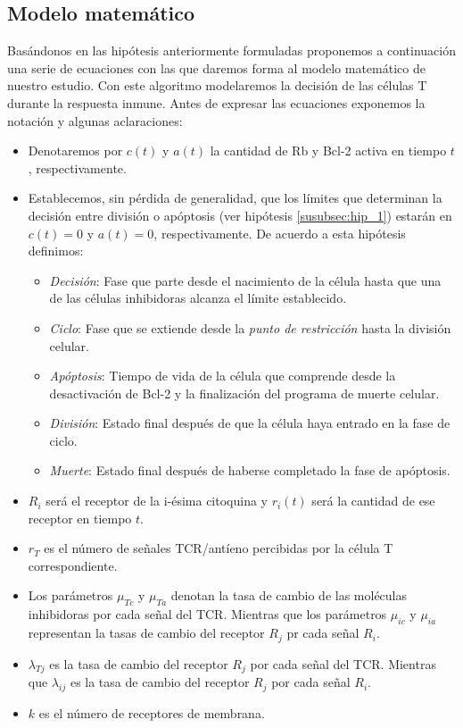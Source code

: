 \subsection{Modelo matemático}
\label{sub:modelo}

Basándonos en las hipótesis anteriormente formuladas proponemos a continuación una serie de ecuaciones con las que daremos forma al modelo matemático de nuestro estudio. Con este algoritmo modelaremos la decisión de las células T durante la respuesta inmune. 
Antes de expresar las ecuaciones exponemos la notación y algunas aclaraciones: 

\begin{itemize}
\item Denotaremos por \textit{$c(t)$} y \textit{$a(t)$} la cantidad de Rb y Bcl-2 activa en tiempo $t$, respectivamente.
\item Establecemos, sin pérdida de generalidad, que los límites que determinan la decisión entre división o apóptosis (ver hipótesis \ref{susubsec:hip_1}) estarán en $c(t)=0$ y $a(t)=0$, respectivamente. De acuerdo a esta hipótesis definimos: 
	\begin{itemize}
		\item \textit{Decisión}: Fase que parte desde el nacimiento de la célula hasta que una de las células inhibidoras alcanza el límite establecido.
		\item \textit{Ciclo}: Fase que se extiende desde la \textit{punto de restricción} hasta la división celular.
		\item \textit{Apóptosis}: Tiempo de vida de la célula que comprende desde la desactivación de Bcl-2 y la finalización del programa de muerte celular.
		\item \textit{División}: Estado final después de que la célula haya entrado en la fase de ciclo.
		\item \textit{Muerte}: Estado final después de haberse completado la fase de apóptosis.
	\end{itemize}
\item \textit{$R_{i}$} será el receptor de la i-ésima citoquina y \textit{$r_{i}(t)$} será la cantidad de ese receptor en tiempo $t$. 
\item $r_{T}$ es el número de señales TCR/antíeno  percibidas por la célula T correspondiente.
\item Los parámetros $\mu_{Tc}$ y $\mu_{Ta}$ denotan la tasa de cambio de las moléculas inhibidoras por cada señal del TCR. Mientras que los parámetros $\mu_{ic}$ y $\mu_{ia}$ representan la tasas de cambio del receptor $R_j$ pr cada señal $R_i$.
\item $\lambda_{Tj}$ es la tasa de cambio del receptor $R_{j}$ por cada señal del TCR. Mientras que $\lambda_{ij}$ es la tasa de cambio del receptor $R_j$ por cada señal $R_i$.
\item $k$ es el número de receptores de membrana.
\end{itemize} 


